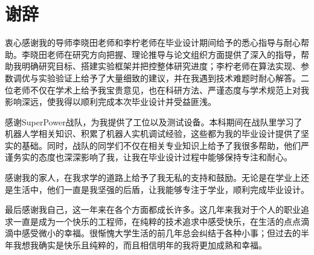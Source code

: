 \chapter*{谢辞}

衷心感谢我的导师李晓田老师和李柠老师在毕业设计期间给予的悉心指导与耐心帮助。李晓田老师在研究方向把握、理论推导与论文组织方面提供了深入的指导，帮助我明确研究目标、搭建实验框架并把控整体研究进度；李柠老师在算法实现、参数调优与实验验证上给予了大量细致的建议，并在我遇到技术难题时耐心解答。二位老师不仅在学术上给予我宝贵意见，也在科研方法、严谨态度与学术规范上对我影响深远，使我得以顺利完成本次毕业设计并受益匪浅。

感谢SuperPower战队，为我提供了工位以及测试设备。本科期间在战队里学习了机器人学相关知识、积累了机器人实机调试经验，这些都为我的毕业设计提供了坚实的基础。同时，战队的同学们不仅在相关专业知识上给予了我很多帮助，他们严谨务实的态度也深深影响了我，让我在毕业设计过程中能够保持专注和耐心。

感谢我的家人，在我求学的道路上给予了我无私的支持和鼓励。无论是在学业上还是生活中，他们一直是我坚强的后盾，让我能够专注于学业，顺利完成毕业设计。

最后感谢我自己，这一年来在各个方面都成长许多。这几年来我对于个人的职业追求一直是成为一个快乐的工程师，在纯粹的技术追求中感受快乐，在生活的点点滴滴中感受微小的幸福。很惭愧大学生活的前几年总会纠结于各种小事；但过去的半年我想我确实是快乐且纯粹的，而且相信明年的我将更加成熟和幸福。